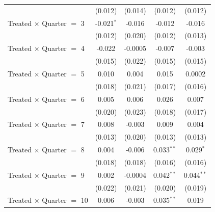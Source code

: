 \begin{longtable}{lcccc}
                                  & (0.012)                                   & (0.014)        & (0.012)      & (0.012)       \\
  Treated $\times$ Quarter $=$ 3  & -0.021$^{*}$                              & -0.016         & -0.012       & -0.016        \\
                                  & (0.012)                                   & (0.020)        & (0.012)      & (0.013)       \\
  Treated $\times$ Quarter $=$ 4  & -0.022                                    & -0.0005        & -0.007       & -0.003        \\
                                  & (0.015)                                   & (0.022)        & (0.015)      & (0.015)       \\
  Treated $\times$ Quarter $=$ 5  & 0.010                                     & 0.004          & 0.015        & 0.0002        \\
                                  & (0.018)                                   & (0.021)        & (0.017)      & (0.016)       \\
  Treated $\times$ Quarter $=$ 6  & 0.005                                     & 0.006          & 0.026        & 0.007         \\
                                  & (0.020)                                   & (0.023)        & (0.018)      & (0.017)       \\
  Treated $\times$ Quarter $=$ 7  & 0.008                                     & -0.003         & 0.009        & 0.004         \\
                                  & (0.013)                                   & (0.020)        & (0.013)      & (0.013)       \\
  Treated $\times$ Quarter $=$ 8  & 0.004                                     & -0.006         & 0.033$^{**}$ & 0.029$^{*}$   \\
                                  & (0.018)                                   & (0.018)        & (0.016)      & (0.016)       \\
  Treated $\times$ Quarter $=$ 9  & 0.002                                     & -0.0004        & 0.042$^{**}$ & 0.044$^{**}$  \\
                                  & (0.022)                                   & (0.021)        & (0.020)      & (0.019)       \\
  Treated $\times$ Quarter $=$ 10 & 0.006                                     & -0.003         & 0.035$^{**}$ & 0.019         \\

\end{longtable}
